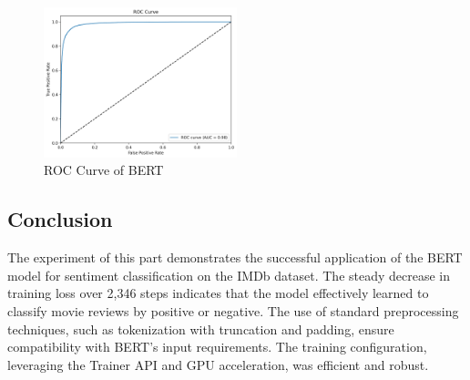 \begin{figure}[ht]
    \centering
    \includegraphics[width=0.5\textwidth]{pics/bert_roc_curve.png}
    \caption{ROC Curve of BERT}
\end{figure}

\subsection{Conclusion}
The experiment of this part demonstrates the successful application of the BERT model for sentiment classification on the IMDb dataset. The steady decrease in training loss over 2,346 steps indicates that the model effectively learned to classify movie reviews by positive or negative. The use of standard preprocessing techniques, such as tokenization with truncation and padding, ensure compatibility with BERT's input requirements. The training configuration, leveraging the Trainer API and GPU acceleration, was efficient and robust.